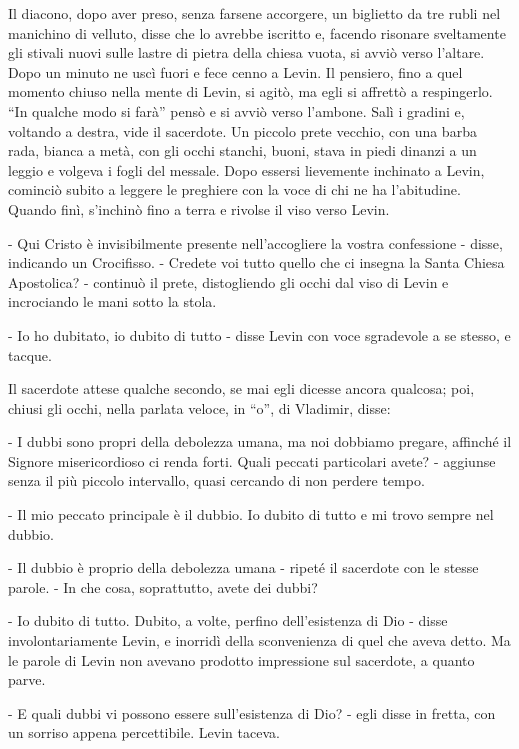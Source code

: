 Il diacono, dopo aver preso, senza farsene accorgere, un biglietto da tre rubli nel manichino di velluto, disse che lo avrebbe iscritto e, facendo risonare sveltamente gli stivali nuovi sulle lastre di pietra della chiesa vuota, si avviò verso l'altare. Dopo un minuto ne uscì fuori e fece cenno a Levin. Il pensiero, fino a quel momento chiuso nella mente di Levin, si agitò, ma egli si affrettò a respingerlo. ``In qualche modo si farà'' pensò e si avviò verso l'ambone. Salì i gradini e, voltando a destra, vide il sacerdote. Un piccolo prete vecchio, con una barba rada, bianca a metà, con gli occhi stanchi, buoni, stava in piedi dinanzi a un leggio e volgeva i fogli del messale. Dopo essersi lievemente inchinato a Levin, cominciò subito a leggere le preghiere con la voce di chi ne ha l'abitudine. Quando finì, s'inchinò fino a terra e rivolse il viso verso Levin. 

- Qui Cristo è invisibilmente presente nell'accogliere la vostra confessione - disse, indicando un Crocifisso. - Credete voi tutto quello che ci insegna la Santa Chiesa Apostolica? - continuò il prete, distogliendo gli occhi dal viso di Levin e incrociando le mani sotto la stola. 

- Io ho dubitato, io dubito di tutto - disse Levin con voce sgradevole a se stesso, e tacque. 

Il sacerdote attese qualche secondo, se mai egli dicesse ancora qualcosa; poi, chiusi gli occhi, nella parlata veloce, in ``o'', di Vladimir, disse: 

- I dubbi sono propri della debolezza umana, ma noi dobbiamo pregare, affinché il Signore misericordioso ci renda forti. Quali peccati particolari avete? - aggiunse senza il più piccolo intervallo, quasi cercando di non perdere tempo. 

- Il mio peccato principale è il dubbio. Io dubito di tutto e mi trovo sempre nel dubbio. 

- Il dubbio è proprio della debolezza umana - ripeté il sacerdote con le stesse parole. - In che cosa, soprattutto, avete dei dubbi? 

- Io dubito di tutto. Dubito, a volte, perfino dell'esistenza di Dio - disse involontariamente Levin, e inorridì della sconvenienza di quel che aveva detto. Ma le parole di Levin non avevano prodotto impressione sul sacerdote, a quanto parve. 

- E quali dubbi vi possono essere sull'esistenza di Dio? - egli disse in fretta, con un sorriso appena percettibile. Levin taceva. 
\enlargethispage*{1\baselineskip}


